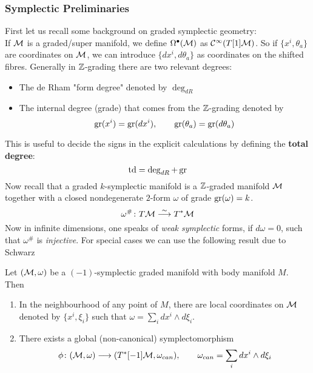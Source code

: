 \subsubsection{Symplectic Preliminaries}
First let us recall some background on graded symplectic geometry:\\
If $\mathcal{M}$ is a graded/super manifold, we define $\Omega^\bullet(\mathcal{M})$ as $\mathcal{C}^{\infty}(T[1]\mathcal{M})$. So if $\{x^i, \theta_a\}$ are coordinates on $\mathcal{M}$, we can introduce $\{dx^i, d\theta_a\}$ as coordinates on the shifted fibres. Generally in $\mathbb{Z}$-grading there are two relevant degrees:
\begin{itemize}
  \item The de Rham "form degree" denoted by $\deg_{dR}$
  \item The internal degree (grade) that comes from the $\mathbb{Z}$-grading denoted by
  $$ \operatorname{gr}(x^i) = \operatorname{gr}(dx^i), \quad \quad \operatorname{gr}(\theta_a) = \operatorname{gr}(d\theta_a) $$
\end{itemize}
This is useful to decide the signs in the explicit calculations by defining the \textbf{total degree}:
\begin{equation}
  \operatorname{td} = \deg_{dR} + \operatorname{gr}
\end{equation}
Now recall that a graded $k$-symplectic manifold is a $\mathbb{Z}$-graded manifold $\mathcal{M}$ together with a closed nondegenerate $2$-form $\omega$ of grade $\operatorname{gr}(\omega) = k$.
\begin{equation}
  \omega^\# \colon T\mathcal{M} \overset{\sim}{\longrightarrow} T^* \mathcal{M}
\end{equation}
Now in infinite dimensions, one speaks of \emph{weak symplectic} forms, if $d \omega = 0$, such that $\omega^\#$ is \emph{injective}. For special cases we can use the following result due to Schwarz

\begin{theo}[Schwarz]
  Let $(\mathcal{M}, \omega)$ be a $(-1)$-symplectic graded manifold with body manifold $M$. Then
  \begin{enumerate}
    \item In the neighbourhood of any point of $M$, there are local coordinates on $\mathcal{M}$ denoted by $\{x^i, \xi_i\}$ such that $\omega = \sum_i dx^i \wedge d\xi_i$.

    \item There exists a global (non-canonical) symplectomorphism
    \begin{equation}
      \phi \colon (\MM, \omega) \lra (T^*[-1]\MM, \omega_{can}), \quad \quad \omega_{can} = \sum_i dx^i \wedge d\xi_i
    \end{equation}
  \end{enumerate}
\end{theo}

